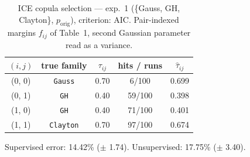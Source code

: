 \begin{table}[htbp]
  \centering
  \caption{ICE copula selection — exp.\ 1 (\{Gauss, GH, Clayton\}, $p_{\text{orig}}$), criterion: AIC. Pair-indexed margins $f_{ij}$ of Table~1, second Gaussian parameter read as a variance.}
  \label{tab:exp3-exp1_orig_p__aic}
  \begin{tabular}{ccccc}
    \toprule
    $(i, j)$ & true family & $\tau_{ij}$ & hits / runs & $\hat\tau_{ij}$ \\
    \midrule
    (0, 0) & \texttt{Gauss} & 0.70 & 6/100 & 0.699 \\
    (0, 1) & \texttt{GH} & 0.40 & 59/100 & 0.398 \\
    (1, 0) & \texttt{GH} & 0.40 & 71/100 & 0.401 \\
    (1, 1) & \texttt{Clayton} & 0.70 & 97/100 & 0.674 \\
    \bottomrule
  \end{tabular}
  \par\smallskip Supervised error: 14.42\% ($\pm$ 1.74). Unsupervised: 17.75\% ($\pm$ 3.40).
\end{table}
